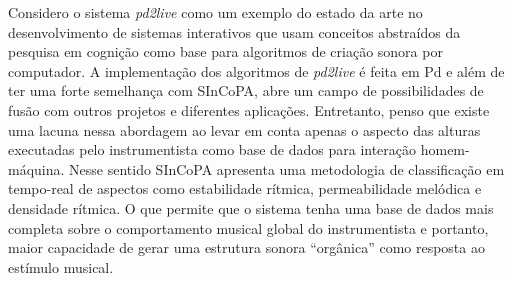 \documentclass{ppgmus}
\begin{document}
Considero o sistema \textit{pd2live} como um exemplo do estado da arte no desenvolvimento de sistemas interativos
que usam conceitos abstraídos da pesquisa em cognição como base para algoritmos de criação sonora por computador.
A implementação dos algoritmos de \textit{pd2live} é feita em Pd e além de ter uma forte semelhança com SInCoPA, abre um campo
de possibilidades de fusão com outros projetos e diferentes aplicações.
Entretanto, penso que existe uma lacuna nessa abordagem ao levar em conta apenas o aspecto das alturas executadas
pelo instrumentista como base de dados para interação homem-máquina. Nesse sentido SInCoPA apresenta uma  
metodologia de classificação em tempo-real de aspectos como estabilidade rítmica, permeabilidade melódica e densidade
rítmica. O que permite que o sistema tenha uma base de dados mais completa sobre o comportamento musical global do instrumentista e
portanto, maior capacidade de gerar uma estrutura sonora ``orgânica'' como resposta ao estímulo musical.






% 
% 
% 
\end{document}
